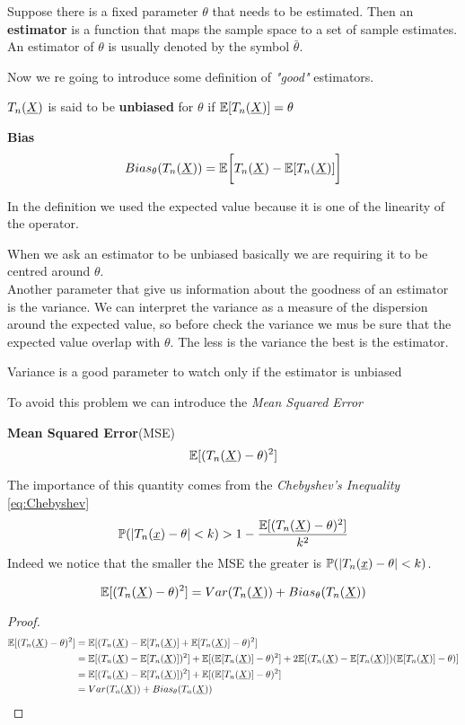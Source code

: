 \begin{defi}
	Suppose there is a fixed parameter $\theta$ that needs to be estimated. Then an \textbf{estimator} is a function that maps the sample space to a set of sample estimates. An estimator of $\theta$ is usually denoted by the symbol $\bar \theta$.
\end{defi}
Now we re going to introduce some definition of \textit{"good"} estimators.
\begin{defi}
	$T_n(\underline X)$ is said to be \textbf{unbiased} for $\theta$ if $\mathbb{E}[T_n(\underline X)]=\theta$
\end{defi}
\begin{defi}
	\textbf{Bias}
	\[
		Bias_\theta (T_n(\underline X))=\mathbb{E}\bigg[T_n(\underline X)-\mathbb{E}[T_n(\underline X)]\bigg]
	\]
\end{defi}
\begin{oss}
	In the definition we used the expected value because it is one of the linearity of the operator.
\end{oss}
When we ask an estimator to be unbiased basically we are requiring it to be centred around $\theta$.\\
Another parameter that give us information about the goodness of an estimator is the variance. We can interpret the variance as a measure of the dispersion around the expected value, so before check the variance we mus be sure that the expected value overlap with $\theta$. The less is the variance the best is the estimator.
\begin{oss}
	Variance is a good parameter to watch only if the estimator is unbiased
\end{oss}
To avoid this problem we can introduce the \textit{Mean Squared Error}
\begin{defi}\textbf{Mean Squared Error}(MSE)
	\[
	\mathbb{E}[(T_n(\underline X)-\theta)^2]
	\]
\end{defi}
The importance of this quantity comes from the \textit{Chebyshev's Inequality} \ref{eq:Chebyshev}
\[
\mathbb{P}(|T_n(\underline x)-\theta|< k)>1-\frac{\mathbb{E}[(T_n(\underline X)-\theta)^2]}{k^2}
\]
Indeed we notice that the smaller the MSE the greater is $\mathbb{P}(|T_n(\underline x)-\theta|< k)$.
\begin{prop}
	$$\mathbb{E}[(T_n(\underline X)-\theta)^2]=Var(T_n(\underline X))+Bias_\theta(T_n(\underline X))$$
\end{prop}
\begin{proof}
	\[
	\begin{split}
		\mathbb{E}[(T_n(\underline X)-\theta)^2]
		&=\mathbb{E}[(T_n(\underline X) - \mathbb{E}[T_n(\underline X)] + \mathbb{E}[T_n(\underline X)]-\theta)^2 ]\\
		&=\mathbb{E}[(T_n(\underline X)-\mathbb{E}[T_n(\underline X)])^2]+\mathbb{E}[(\mathbb{E}[T_n(\underline X)]-\theta)^2]+2\mathbb{E}[(T_n(\underline X)-\mathbb{E}[T_n(\underline X)])(\mathbb{E}[T_n(\underline X)]-\theta)]\\
		&=\mathbb{E}[(T_n(\underline X)-\mathbb{E}[T_n(\underline X)])^2]+\mathbb{E}[(\mathbb{E}[T_n(\underline X)]-\theta)^2]\\
		&=Var(T_n(\underline X))+Bias_\theta(T_n(\underline X))
	\end{split}
	\]
\end{proof}
